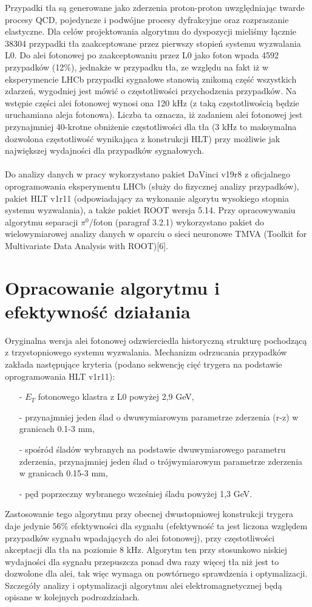 \documentclass{pracamgr}
\begin{document}
Przypadki tła są generowane jako zderzenia proton-proton uwzględniając twarde procesy QCD, pojedyncze i podwójne procesy dyfrakcyjne oraz rozpraszanie elastyczne. Dla celów projektowania algorytmu do dyspozycji mieliśmy łącznie 38304 przypadki tła zaakceptowane przez pierwszy stopień systemu wyzwalania L0. Do alei fotonowej po zaakceptowaniu przez L0 jako foton wpada 4592 przypadków (12\%), jednakże w przypadku tła, ze względu na fakt iż w eksperymencie LHCb przypadki sygnałowe stanowią znikomą część wszystkich zdarzeń, wygodniej jest mówić o częstotliwości przychodzenia przypadków. Na wstępie części alei fotonowej wynosi ona 120 kHz (z taką częstotliwością będzie uruchamiana aleja fotonowa). Liczba ta oznacza, iż zadaniem alei fotonowej jest przynajmniej 40-krotne obniżenie częstotliwości dla tła (3 kHz to maksymalna dozwolona częstotliwość wynikająca z konstrukcji HLT) przy możliwie jak największej wydajności dla przypadków sygnałowych.
\\\\
\noindent
Do analizy danych w pracy wykorzystano pakiet DaVinci v19r8 z oficjalnego oprogramowania eksperymentu LHCb (służy do fizycznej analizy przypadków), pakiet HLT v1r11 (odpowiadający za wykonanie algorytu wysokiego stopnia systemu wyzwalania), a także pakiet ROOT wersja 5.14. Przy opracowywaniu algorytmu separacji $\pi^0$/foton (paragraf 3.2.1) wykorzystano pakiet do wielowymiarowej analizy danych w oparciu o sieci neuronowe TMVA (Toolkit for Multivariate Data Analysis with ROOT)[6].

\section{Opracowanie algorytmu i efektywność działania}
Oryginalna wersja alei fotonowej odzwierciedla historyczną strukturę pochodzącą z trzystopniowego systemu wyzwalania. Mechanizm odrzucania przypadków zakłada następujące kryteria (podano sekwencję cięć trygera na podstawie oprogramowania HLT v1r11):
\begin{itemize}
 \item[-] $E_T$ fotonowego klastra z L0 powyżej 2,9 GeV,
 \item[-] przynajmniej jeden ślad o dwuwymiarowym parametrze zderzenia (r-z) w granicach 0.1-3 mm,
 \item[-] spośród śladów wybranych na podstawie dwuwymiarowego parametru zderzenia, przynajmniej jeden ślad o trójwymiarowym parametrze zderzenia w granicach 0.15-3 mm,
 \item[-] pęd poprzeczny wybranego wcześniej śladu powyżej 1,3 GeV. 
\end{itemize}
\noindent
Zastosowanie tego algorytmu przy obecnej dwustopniowej konstrukcji trygera daje jedynie 56\% efektywności dla sygnału (efektywność ta jest liczona względem przypadków sygnału wpadających do alei fotonowej), przy częstotliwości akceptacji dla tła na poziomie 8 kHz. Algorytm ten przy stosunkowo niskiej wydajności dla sygnału przepuszcza ponad dwa razy więcej tła niż jest to dozwolone dla alei, tak więc wymaga on powtórnego sprawdzenia i optymalizacji. Szczegóły analizy i optymalizacji algorytmu alei elektromagnetycznej będą opisane w kolejnych podrozdziałach. 
\end{document}
